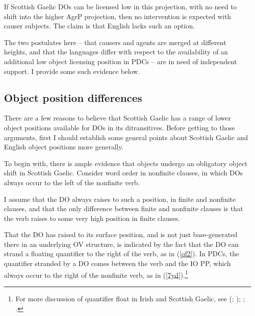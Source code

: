 \documentclass[output=paper,colorlinks,citecolor=brown]{langscibook}
\begin{document}
\newpage
If Scottish Gaelic DOs can be licensed low in this projection, with no need to shift into the higher AgrP projection, then no intervention is expected with causer subjects. The claim is that English lacks such an option.

The two postulates here -- that causers and agents are merged at different heights, and that the languages differ with respect to the availability of an additional low object licensing position in PDCs -- are in need of independent support. I provide some such evidence below. 

\subsection{Object position differences}

There are a few reasons to believe that Scottish Gaelic has a range of lower object positions available for DOs in its ditransitives. Before getting to those arguments, first I should establish some general points about Scottish Gaelic and English object positions more generally.  

To begin with, there is ample evidence that objects undergo an obligatory object shift in Scottish Gaelic. Consider word order in nonfinite clauses, in which DOs always occur to the left of the nonfinite verb. 


\noindent I assume that the DO always raises to such a position, in finite and nonfinite clauses, and that the only difference between finite and nonfinite clauses is that the verb raises to some very high position in finite clauses. 

That the DO has raised to its surface position, and is not just base-generated there in an underlying OV structure, is indicated by the fact that the DO can strand a floating quantifier to the right of the verb, as in (\ref{of2}). In PDCs, the quantifier stranded by a DO comes between the verb and the IO PP, which always occur to the right of the nonfinite verb, as in (\ref{7yd}).\footnote{For more discussion of quantifier float in Irish and Scottish Gaelic, see \citeauthor{gt:Maki:2008} (\citeyear{gt:Maki:2008}; \citeyear{gt:Maki:2011}); \citet{gt:McCloskey:2017}; \citet{gt:Thoms:2024p}.} 
\end{document}
